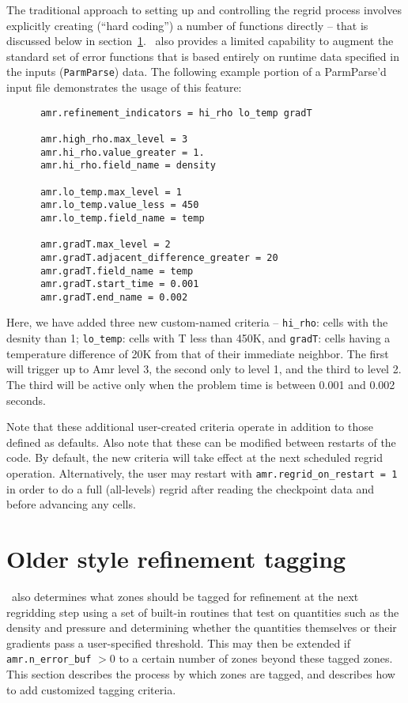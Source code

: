 The traditional approach to setting up and controlling the regrid process involves explicitly
creating (``hard coding'') a number of functions directly -- that is discussed below in section~\ref{sec:oldtagging}.
\iamr\ also provides a limited capability to augment
the standard set of error functions that is based entirely on runtime data specified in the inputs ({\tt ParmParse})
data.  The following example portion of a ParmParse'd input file demonstrates the usage of this feature:

\begin{verbatim}
      amr.refinement_indicators = hi_rho lo_temp gradT

      amr.high_rho.max_level = 3
      amr.hi_rho.value_greater = 1.
      amr.hi_rho.field_name = density

      amr.lo_temp.max_level = 1
      amr.lo_temp.value_less = 450
      amr.lo_temp.field_name = temp

      amr.gradT.max_level = 2
      amr.gradT.adjacent_difference_greater = 20
      amr.gradT.field_name = temp
      amr.gradT.start_time = 0.001
      amr.gradT.end_name = 0.002
\end{verbatim}

Here, we have added three new custom-named criteria -- {\tt hi\_rho}: cells with the desnity than 1;
{\tt lo\_temp}: cells with T less than 450K, and {\tt gradT}: cells having a temperature difference of 20K from that of their
immediate neighbor.  The first will trigger up to Amr level 3, the second only to level 1, and the third to level 2.
The third will be active only when the problem time is between 0.001 and 0.002 seconds.

Note that these additional user-created criteria operate in addition to those defined as defaults.  Also note that
these can be modified between restarts of the code.  By default, the new criteria will take effect at the next
scheduled regrid operation.  Alternatively, the user may restart with {\tt amr.regrid\_on\_restart = 1} in order to
do a full (all-levels) regrid after reading the checkpoint data and before advancing any cells.


\section{Older style refinement tagging}
\label{sec:oldtagging}

\iamr\ also determines what zones should be tagged for refinement at the next 
regridding step using a set of built-in routines that test on 
quantities such as the density and pressure and determining whether the 
quantities themselves or their gradients pass a user-specified threshold. 
This may then be extended if {\tt amr.n\_error\_buf} $> 0$ to a certain number 
of zones beyond these tagged zones. This section describes the process 
by which zones are tagged, and describes how to add customized tagging criteria.

